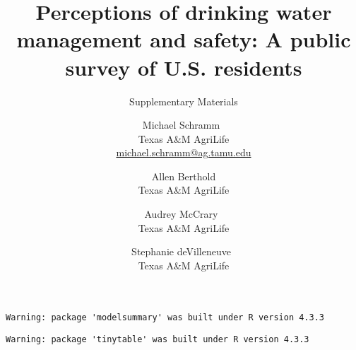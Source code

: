 \documentclass[
]{article}
\title{Perceptions of drinking water management and safety: A public
survey of U.S. residents}
\subtitle{Supplementary Materials}
\author{
{\large Michael Schramm~\orcidlink{0000-0003-1876-6592}}%
 \\%
Texas A\&M AgriLife \\%
{\footnotesize \url{michael.schramm@ag.tamu.edu}} \and
{\large Allen Berthold}%
 \\%
Texas A\&M AgriLife \\%
{\footnotesize \url{}} \and
{\large Audrey McCrary~\orcidlink{0000-0002-7061-6113}}%
 \\%
Texas A\&M AgriLife \\%
{\footnotesize \url{}} \and
{\large Stephanie deVilleneuve~\orcidlink{0009-0002-3984-035X}}%
 \\%
Texas A\&M AgriLife \\%
{\footnotesize \url{}} \and
}
\date{}
\newcommand{\published}[1]{%
   \gdef\puB{#1}}
\newcommand{\puB}{}
\begin{document}
\published{\textbf{}}

\maketitle





\begin{verbatim}
Warning: package 'modelsummary' was built under R version 4.3.3
\end{verbatim}

\begin{verbatim}
Warning: package 'tinytable' was built under R version 4.3.3
\end{verbatim}
\end{document}
